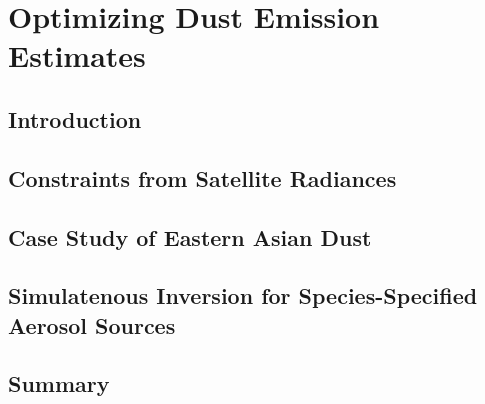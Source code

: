 \chapter{Optimizing Dust Emission Estimates}

\section{Introduction}

\section{Constraints from Satellite Radiances}

\section{Case Study of Eastern Asian Dust}

\section{Simulatenous Inversion for Species-Specified Aerosol Sources}

\section{Summary}
